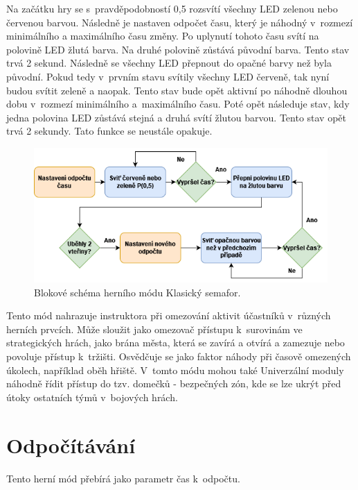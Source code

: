 Na začátku hry se s~pravděpodobností 0,5 rozsvítí všechny LED zelenou nebo červenou barvou. Následně je nastaven odpočet času, který je náhodný v~rozmezí minimálního a maximálního času změny. 
Po uplynutí tohoto času svítí na polovině LED žlutá barva. Na druhé polovině zůstává původní barva. Tento stav trvá 2 sekund. Následně se všechny LED přepnout do opačné barvy než byla původní. 
Pokud tedy v~prvním stavu svítily všechny LED červeně, tak nyní budou svítit zeleně a naopak. Tento stav bude opět aktivní po náhodně dlouhou dobu v~rozmezí minimálního a~maximálního času. Poté 
opět následuje stav, kdy jedna polovina LED zůstává stejná a druhá svítí žlutou barvou. Tento stav opět trvá 2 sekundy. Tato funkce se neustále opakuje. 

\begin{figure}[!h]
  \begin{center}
    \includegraphics[scale=0.7]{obrazky/Klasicky_semafor_diagram.png}
  \end{center}
  \caption[Blokové schéma herního módu Klasický semafor]{Blokové schéma herního módu Klasický semafor.}
\end{figure}

Tento mód nahrazuje instruktora při omezování aktivit účastníků v~různých herních prvcích. Může sloužit jako omezovač přístupu k~surovinám ve strategických hrách, jako brána města, která se zavírá 
a otvírá a zamezuje nebo povoluje přístup k~tržišti. Osvědčuje se jako faktor náhody při časově omezených úkolech, například oběh hřiště. V~tomto módu mohou také Univerzální moduly náhodně řídit 
přístup do tzv. domečků - bezpečných zón, kde se lze ukrýt před útoky ostatních týmů v~bojových hrách.

\section{Odpočítávání}
Tento herní mód přebírá jako parametr čas k~odpočtu.

